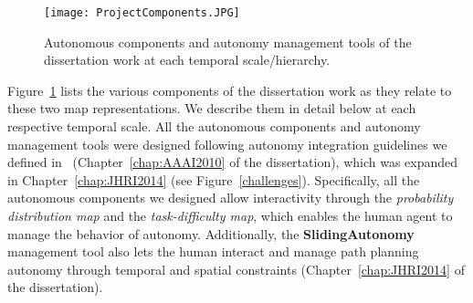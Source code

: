 
\begin{figure}
\centering
\texttt{[image: ProjectComponents.JPG]}
\caption[Autonomous components and autonomy management tools]{Autonomous components and autonomy management tools of the dissertation work at each temporal scale/hierarchy.}
\label{ProjectComponents}
\end{figure}

Figure~\ref{ProjectComponents} lists the various components of the dissertation work as they relate to these two map representations. We describe them in detail below at each respective temporal scale. All the autonomous components and autonomy management tools were designed following autonomy integration guidelines we defined in~\cite{Lin2010Supporting} (Chapter~\ref{chap:AAAI2010} of the dissertation), which was expanded in Chapter~\ref{chap:JHRI2014} (see Figure~\ref{challenges}). Specifically, all the autonomous components we designed allow interactivity through the \textit{probability distribution map} and the \textit{task-difficulty map}, which enables the human agent to manage the behavior of autonomy. Additionally, the \textbf{SlidingAutonomy} management tool also lets the human interact and manage path planning autonomy through temporal and spatial constraints (Chapter~\ref{chap:JHRI2014} of the dissertation).

